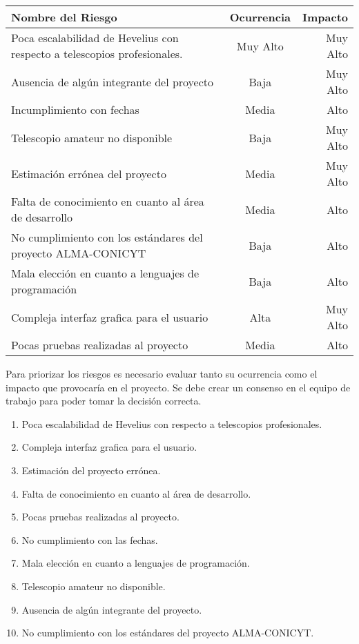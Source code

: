 \documentclass[letterpaper,spanish,10pt]{article}
\begin{document}
\begin{tabular}{||l | c | r||}
\hline
Nombre del Riesgo & Ocurrencia & Impacto \\ 
\hline
Poca escalabilidad de Hevelius con respecto a telescopios profesionales. & Muy Alto & Muy Alto\\
\hline
Ausencia de alg\'un integrante del proyecto & Baja & Muy Alto\\
\hline
Incumplimiento con fechas & Media & Alto\\
\hline
Telescopio amateur no disponible & Baja & Muy Alto\\
\hline
Estimaci\'on err\'onea del proyecto & Media & Muy Alto\\
\hline
Falta de conocimiento en cuanto al \'area de desarrollo & Media & Alto\\
\hline
No cumplimiento con los est\'andares del proyecto ALMA-CONICYT & Baja & Alto\\
\hline
Mala elecci\'on en cuanto a lenguajes de programaci\'on & Baja & Alto\\
\hline
Compleja interfaz grafica para el usuario & Alta & Muy Alto\\
\hline
Pocas pruebas realizadas al proyecto & Media & Alto\\
\hline
\end{tabular}

Para priorizar los riesgos es necesario evaluar tanto su ocurrencia como el impacto que provocar\'ia en el proyecto.
Se debe crear un consenso en el equipo de trabajo para poder tomar la decisi\'on correcta.

\begin{enumerate}
	\item Poca escalabilidad de Hevelius con respecto a telescopios profesionales.
	\item Compleja interfaz grafica para el usuario.
	\item Estimaci\'on del proyecto err\'onea.
	\item Falta de conocimiento en cuanto al \'area de desarrollo.
	\item Pocas pruebas realizadas al proyecto.
	\item No cumplimiento con las fechas.
	\item Mala elecci\'on en cuanto a lenguajes de programaci\'on.
	\item Telescopio amateur no disponible.
	\item Ausencia de alg\'un integrante del proyecto.
	\item No cumplimiento con los est\'andares del proyecto ALMA-CONICYT.
\end{enumerate}
\end{document}
